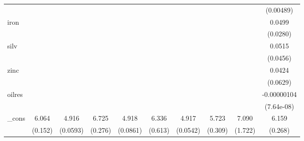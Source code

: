 {\begin{tabular}{l*{9}{c}}
            &                     &                     &                     &                     &                     &                     &                     &                     &   (0.00489)         \\
[1em]
iron        &                     &                     &                     &                     &                     &                     &                     &                     &      0.0499\sym{*}  \\
            &                     &                     &                     &                     &                     &                     &                     &                     &    (0.0280)         \\
[1em]
silv        &                     &                     &                     &                     &                     &                     &                     &                     &      0.0515         \\
            &                     &                     &                     &                     &                     &                     &                     &                     &    (0.0456)         \\
[1em]
zinc        &                     &                     &                     &                     &                     &                     &                     &                     &      0.0424         \\
            &                     &                     &                     &                     &                     &                     &                     &                     &    (0.0629)         \\
[1em]
oilres      &                     &                     &                     &                     &                     &                     &                     &                     & -0.00000104\sym{***}\\
            &                     &                     &                     &                     &                     &                     &                     &                     &  (7.64e-08)         \\
[1em]
\_cons      &       6.064\sym{***}&       4.916\sym{***}&       6.725\sym{***}&       4.918\sym{***}&       6.336\sym{***}&       4.917\sym{***}&       5.723\sym{***}&       7.090\sym{***}&       6.159\sym{***}\\
            &     (0.152)         &    (0.0593)         &     (0.276)         &    (0.0861)         &     (0.613)         &    (0.0542)         &     (0.309)         &     (1.722)         &     (0.268)         \\

\end{tabular}}
